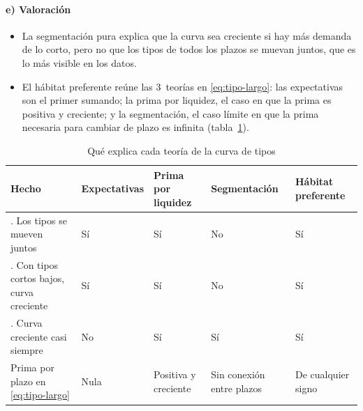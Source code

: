 \documentclass[11pt]{article}
\begin{document}
\paragraph{e) Valoración}
\begin{itemize}
\item La segmentación pura explica que la curva sea creciente si hay más demanda de lo corto, pero no que los tipos de todos los plazos se muevan juntos, que es lo más visible en los datos.
\item El hábitat preferente reúne las 3~teorías en \eqref{eq:tipo-largo}: las expectativas son el primer sumando; la prima por liquidez, el caso en que la prima es positiva y creciente; y la segmentación, el caso límite en que la prima necesaria para cambiar de plazo es infinita (tabla~\ref{tab:teorias-curva}).
\end{itemize}

\begin{table}[H]
\centering
\caption{Qué explica cada teoría de la curva de tipos}\label{tab:teorias-curva}
\small
\begin{tabular}{>{\raggedright\arraybackslash}m{4.0cm}>{\centering\arraybackslash}m{2.2cm}>{\centering\arraybackslash}m{2.3cm}>{\centering\arraybackslash}m{2.4cm}>{\centering\arraybackslash}m{2.3cm}}
\toprule
\rowcolor{tceeazulpalido} \textbf{Hecho} & \textbf{Expectativas} & \textbf{Prima por liquidez} & \textbf{Segmentación} & \textbf{Hábitat preferente}\\
\midrule
1. Los tipos se mueven juntos & \textcolor{tceeverde}{Sí} & \textcolor{tceeverde}{Sí} & \textcolor{tceerojo}{No} & \textcolor{tceeverde}{Sí}\\
\addlinespace[0.2em]
2. Con tipos cortos bajos, curva creciente & \textcolor{tceeverde}{Sí} & \textcolor{tceeverde}{Sí} & \textcolor{tceerojo}{No} & \textcolor{tceeverde}{Sí}\\
\addlinespace[0.2em]
3. Curva creciente casi siempre & \textcolor{tceerojo}{No} & \textcolor{tceeverde}{Sí} & \textcolor{tceeverde}{Sí} & \textcolor{tceeverde}{Sí}\\
\addlinespace[0.2em]
\rowcolor{tceesalvia} Prima por plazo en \eqref{eq:tipo-largo} & Nula & Positiva y creciente & Sin conexión entre plazos & De cualquier signo\\
\bottomrule
\end{tabular}
\end{table}
\end{document}
